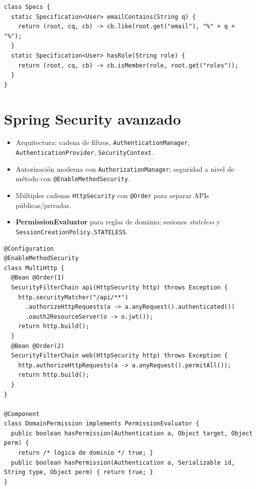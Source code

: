 \documentclass[11pt,a4paper]{article}
\begin{document}
\begin{lstlisting}[style=javastyle, caption={Specifications para filtros dinámicos}] 
class Specs {
  static Specification<User> emailContains(String q) {
    return (root, cq, cb) -> cb.like(root.get("email"), "%" + q + "%");
  }
  static Specification<User> hasRole(String role) {
    return (root, cq, cb) -> cb.isMember(role, root.get("roles"));
  }
}
\end{lstlisting}

\section{Spring Security avanzado}
\begin{itemize}[leftmargin=*]
  \item Arquitectura: cadena de filtros, \texttt{AuthenticationManager}, \texttt{AuthenticationProvider}, \texttt{SecurityContext}.
  \item Autorización moderna con \texttt{AuthorizationManager}; seguridad a nivel de método con \texttt{@EnableMethodSecurity}.
  \item Múltiples cadenas \texttt{HttpSecurity} con \texttt{@Order} para separar APIs públicas/privadas.
  \item \textbf{PermissionEvaluator} para reglas de dominio; sesiones \emph{stateless} y \texttt{SessionCreationPolicy.STATELESS}.
\end{itemize}

\begin{lstlisting}[style=javastyle, caption={Múltiples HttpSecurity y PermissionEvaluator}] 
@Configuration
@EnableMethodSecurity
class MultiHttp {
  @Bean @Order(1)
  SecurityFilterChain api(HttpSecurity http) throws Exception {
    http.securityMatcher("/api/**")
      .authorizeHttpRequests(a -> a.anyRequest().authenticated())
      .oauth2ResourceServer(o -> o.jwt());
    return http.build();
  }
  @Bean @Order(2)
  SecurityFilterChain web(HttpSecurity http) throws Exception {
    http.authorizeHttpRequests(a -> a.anyRequest().permitAll());
    return http.build();
  }
}

@Component
class DomainPermission implements PermissionEvaluator {
  public boolean hasPermission(Authentication a, Object target, Object perm) {
    return /* lógica de dominio */ true; }
  public boolean hasPermission(Authentication a, Serializable id, String type, Object perm) { return true; }
}
\end{lstlisting}
\end{document}
